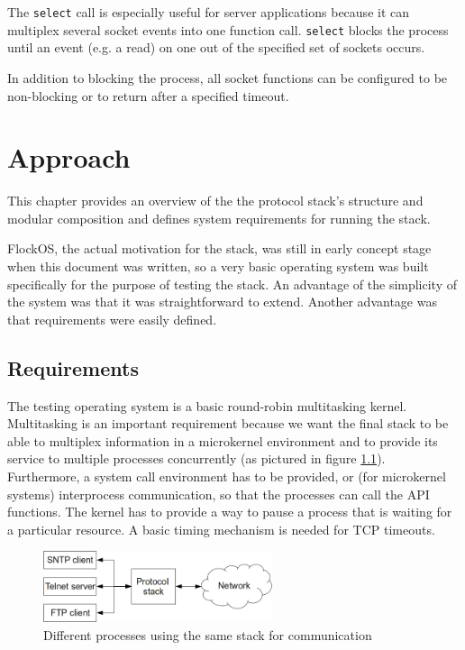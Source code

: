 \documentclass[11pt,twoside,abstract,notitlepage]{scrreprt}
\begin{document}
The \texttt{select} call is especially useful for server applications because it can multiplex several socket events into one function call. \texttt{select} blocks the process until an event (e.g. a read) on one out of the specified set of sockets occurs. 

In addition to blocking the process, all socket functions can be configured to be non-blocking or to return after a specified timeout. 



\chapter{Approach}
This chapter provides an overview of the the protocol stack's structure and modular composition and defines system requirements for running the stack. 

FlockOS, the actual motivation for the stack, was still in early concept stage when this document was written, so a very basic operating system was built specifically for the purpose of testing the stack. An advantage of the simplicity of the system was that it was straightforward to extend. Another advantage was that requirements were easily defined.

\section{Requirements}

The testing operating system is a basic round-robin multitasking kernel. Multitasking is an important requirement because we want the final stack to be able to multiplex information in a microkernel environment and to provide its service to multiple processes concurrently (as pictured in figure \ref{fig:multiplexing}). Furthermore, a system call environment has to be provided, or (for microkernel systems) interprocess communication, so that the processes can call the API functions. The kernel has to provide a way to pause a process that is waiting for a particular resource. A basic timing mechanism is needed for TCP timeouts. 

\begin{figure}
\caption{Different processes using the same stack for communication}
\vspace{0.3cm}
\label{fig:multiplexing}
\centerline{\includegraphics[width=0.6\textwidth]{images/multiplexing.png}}
\end{figure}
\end{document}
